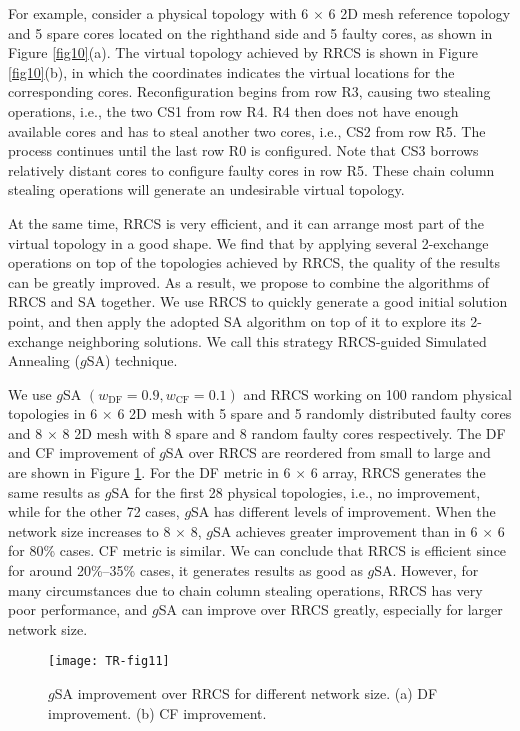 For example, consider a physical topology with 6 $\times$ 6 2D mesh reference topology and 5 spare cores located on the righthand side and 5 faulty cores, as shown in Figure \ref{fig10}(a). The virtual topology achieved by RRCS is shown in Figure \ref{fig10}(b), in which the coordinates indicates the virtual locations for the corresponding cores. Reconfiguration begins from row R3, causing two stealing operations, i.e., the two CS1 from row R4. R4 then does not have enough available cores and has to steal another two cores, i.e., CS2 from row R5. The process continues until the last row R0 is configured. Note that CS3 borrows relatively distant cores to configure faulty cores in row R5. These chain column stealing operations will generate an undesirable virtual topology.


At the same time, RRCS is very efficient, and it can arrange most part of the virtual topology in a good shape. We find that by applying several 2-exchange operations on top of the topologies achieved by RRCS, the quality of the results can be greatly improved. As a result, we propose to combine the algorithms of RRCS and SA together. We use RRCS to quickly generate a good initial solution point, and then apply the adopted SA algorithm on top of it to explore its 2-exchange neighboring solutions. We call this strategy RRCS-guided Simulated Annealing ($g$SA) technique.

We use $g$SA $\left(w_{\mathrm{DF}}=0.9, w_{\mathrm{CF}}=0.1\right)$ and RRCS working on 100 random physical topologies in 6 $\times$ 6 2D mesh with 5 spare and 5 randomly distributed faulty cores and 8 $\times$ 8 2D mesh with 8 spare and 8 random faulty cores respectively. The DF and CF improvement of $g$SA over RRCS are reordered from small to large and are shown in Figure \ref{fig11}. For the DF metric in 6 $\times$ 6 array, RRCS generates the same results as $g$SA for the first 28 physical topologies, i.e., no improvement, while for the other 72 cases, $g$SA has different levels of improvement. When the network size increases to 8 $\times$ 8, $g$SA achieves greater improvement than in 6 $\times$ 6 for 80\% cases. CF metric is similar. We can conclude that RRCS is efficient since for around 20\%–35\% cases, it generates results as good as $g$SA. However, for many circumstances due to chain column stealing operations, RRCS has very poor performance, and $g$SA can improve over RRCS greatly, especially for larger network size.

\begin{figure}[h]
      \centering
        \texttt{[image: TR-fig11]}
          \caption{$g$SA improvement over RRCS for different network size. (a) DF improvement. (b) CF improvement.}
        \label{fig11}
\end{figure}


